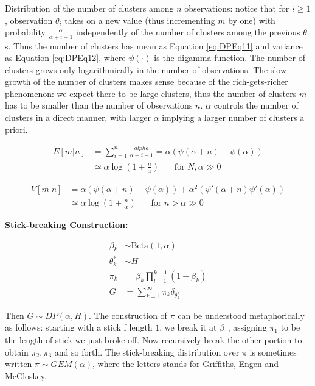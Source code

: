 Distribution of the number of clusters among $n$ observations: notice that for $i\geq1$, observation $\theta_{i}$ takes on a new value (thus incrementing $m$ by one) with probability $\frac{\alpha}{\alpha+i-1}$ independently of the number of clusters among the previous $\theta$s. Thus the number of clusters has mean as Equation \ref{eq:DPEq11} and variance as Equation \ref{eq:DPEq12}, where $\psi(\cdot)$ is the digamma function. The number of clusters grows only logarithmically in the number of observations. The slow growth of the number of clusters makes sense because of the rich-gets-richer phenomenon: we expect there to be large clusters, thus the number of clusters $m$ has to be smaller than the number of observations $n$. $\alpha$ controls the number of clusters in a direct manner, with larger $\alpha$ implying a larger number of clusters a priori.

\begin{align}
\label{eq:DPEq11}
E[m|n]&=\sum_{i=1}^{n}\frac{alpha}{\alpha+i-1}=\alpha(\psi(\alpha+n)-\psi(\alpha)) \nonumber
\\
&\simeq\alpha\log\left(1+\frac{n}{\alpha}\right) \ \ \ \ \ \ \ \ \text{for }N,\alpha\gg0
\end{align}

\begin{align}
\label{eq:DPEq12}
V[m|n]&=\alpha(\psi(\alpha+n)-\psi(\alpha))+\alpha^{2}(\psi'(\alpha+n)\psi'(\alpha)) \nonumber
\\
&\simeq\alpha\log\left(1+\frac{n}{\alpha}\right) \ \ \ \ \ \ \ \ \text{for }n>\alpha\gg0
\end{align}

\textbf{Stick-breaking Construction:} 

\begin{subequations}
\begin{align}
\beta_{k}&\sim\text{Beta}(1,\alpha)
\\
\theta_{k}^{*}&\sim H
\\
\pi_{k}&=\beta_{k}\prod_{l=1}^{k-1}(1-\beta_{k})
\\
G&=\sum_{k=1}^{\infty}\pi_{k}\delta_{\theta_{k}^{*}}
\label{eq:DPEq13}
\end{align}
\end{subequations}

\noindent Then $G\sim DP(\alpha,H)$. The construction of $\pi$ can be understood metaphorically as follows: starting with a stick f length $1$, we break it at $\beta_{1}$, assigning $\pi_{1}$ to be the length of stick we just broke off. Now recursively break the other portion to obtain $\pi_{2},\pi_{3}$ and so forth. The stick-breaking distribution over $\pi$ is sometimes written $\pi\sim GEM(\alpha)$, where the letters stands for Griffiths, Engen and McCloskey.

